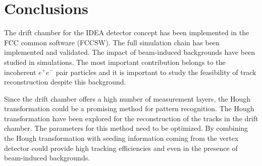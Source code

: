 \section{Conclusions}

The drift chamber for the IDEA detector concept has been implemented in the FCC common software (FCCSW). The full simulation chain has been implemented and validated. The impact of beam-induced backgrounds have been studied in simulations. The most important contribution belongs to the incoherent $e^+e^-$ pair particles and it is important to study the feasibility of track reconstruction despite this background.

Since the drift chamber offers a high number of measurement layers, the Hough transformation could be a promising method for pattern recognition. The Hough transformation have been explored for the reconstruction of the tracks in the drift chamber. The parameters for this method need to be optimized. By combining the Hough transformation with seeding information coming from the vertex detector could provide high tracking efficiencies and even in the presence of beam-induced backgrounds.

